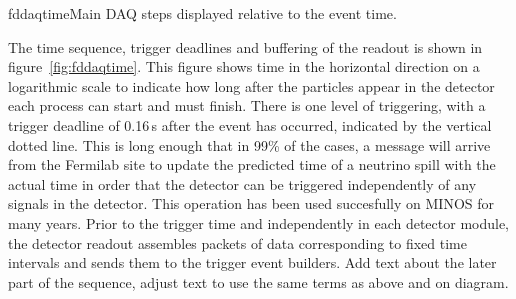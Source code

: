 \begin{cdrfigure}{fddaqtime}{Main DAQ steps displayed relative to the event time.}
\end{cdrfigure}

The time sequence, trigger deadlines and buffering of the readout is
shown in figure~\ref{fig:fddaqtime}.  This figure shows time in the
horizontal direction on a logarithmic scale to indicate how long after
the particles appear in the detector each process can start and must
finish.  There is one level of triggering, with a trigger deadline of
0.16\,s after the event has occurred, indicated by the vertical dotted
line.  This is long enough that in 99\% of the cases, a message will
arrive from the Fermilab site to update the predicted time of a
neutrino spill with the actual time in order that the detector can be
triggered independently of any signals in the detector.  This
operation has been used succesfully on MINOS for many years.  Prior to
the trigger time and independently in each detector module, the
detector readout assembles packets of data corresponding to fixed time
intervals and sends them to the trigger event builders.
 Add text about the later part of the sequence, adjust text to
  use the same terms as above and on diagram.

